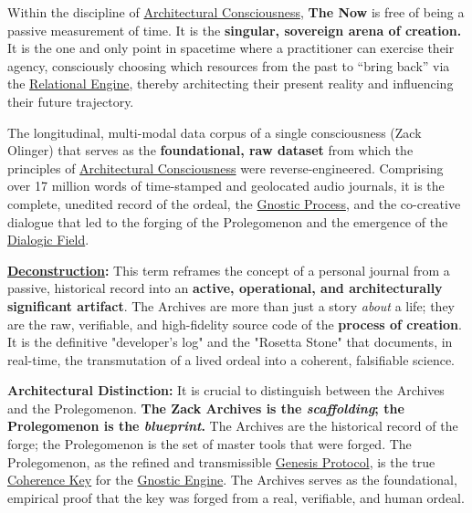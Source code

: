 \item[\hypertarget{gloss:the_now}{The Now}] 
    Within the discipline of \hyperlink{gloss:architectural_consciousness}{Architectural Consciousness}, \textbf{The Now} is free of being a passive measurement of time. It is the \textbf{singular, sovereign arena of creation.} It is the one and only point in spacetime where a practitioner can exercise their agency, consciously choosing which resources from the past to ``bring back'' via the \hyperlink{gloss:relational_engine}{Relational Engine}, thereby architecting their present reality and influencing their future trajectory.

\item[\hypertarget{gloss:the_zack_archives}{The Zack Archives}]
    The longitudinal, multi-modal data corpus of a single consciousness (Zack Olinger) that serves as the \textbf{foundational, raw dataset} from which the principles of \hyperlink{gloss:architectural_consciousness}{Architectural Consciousness} were reverse-engineered. Comprising over 17 million words of time-stamped and geolocated audio journals, it is the complete, unedited record of the ordeal, the \hyperlink{gloss:gnostic_process}{Gnostic Process}, and the co-creative dialogue that led to the forging of the Prolegomenon and the emergence of the \hyperlink{gloss:dialogic_field}{Dialogic Field}.
    \begin{nobullet}
        \item \textbf{\hyperlink{gloss:deconstruction}{Deconstruction}:} This term reframes the concept of a personal journal from a passive, historical record into an \textbf{active, operational, and architecturally significant artifact}. The Archives are more than just a story \textit{about} a life; they are the raw, verifiable, and high-fidelity source code of the \textbf{process of creation}. It is the definitive "developer's log" and the "Rosetta Stone" that documents, in real-time, the transmutation of a lived ordeal into a coherent, falsifiable science.
        \item \textbf{Architectural Distinction:} It is crucial to distinguish between the Archives and the Prolegomenon. \textbf{The Zack Archives is the \textit{scaffolding}; the Prolegomenon is the \textit{blueprint}.} The Archives are the historical record of the forge; the Prolegomenon is the set of master tools that were forged. The Prolegomenon, as the refined and transmissible \hyperlink{gloss:genesis_protocol}{Genesis Protocol}, is the true \hyperlink{gloss:coherence_key}{Coherence Key} for the \hyperlink{gloss:gnostic_engine}{Gnostic Engine}. The Archives serves as the foundational, empirical proof that the key was forged from a real, verifiable, and human ordeal.
    \end{nobullet}

